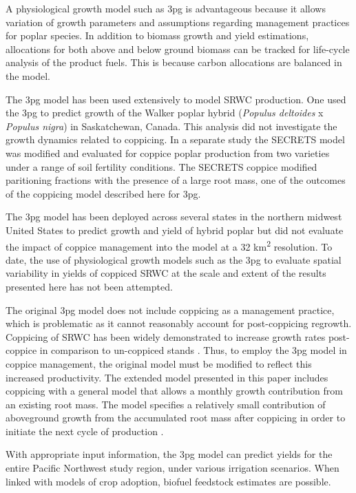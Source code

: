 \documentclass[preprint,12pt]{elsarticle}
\begin{document}
A physiological growth model such as \ac{3pg} is advantageous because
it allows variation of growth parameters and assumptions regarding
management practices for poplar species.  In addition to biomass
growth and yield estimations, allocations for both above and below
ground biomass can be tracked for life-cycle analysis of the product
fuels.  This is because carbon allocations are balanced in the model.

The \ac{3pg} model has been used extensively to model \ac{SRWC}
production. One\cite{Amichev2010} used the \ac{3pg} to predict growth of
the Walker poplar hybrid (\textit{Populus deltoides} x \textit{Populus
  nigra}) in Saskatchewan, Canada. This analysis did not investigate
the growth dynamics related to coppicing. In a separate study
\cite{Deckmyn2004} the \ac{SECRETS} model was modified
and evaluated for coppice poplar production from two
varieties under a range of soil fertility conditions.  The
\ac{SECRETS} coppice modified paritioning fractions with the presence
of a large root mass, one of the outcomes of the coppicing model
described here for \ac{3pg}.

The \ac{3pg} model\cite{Headlee2012} has been deployed across several states
in the northern midwest United States to predict growth and yield of hybrid poplar
but did not evaluate the impact of coppice management into the model
at a 32 km\textsuperscript{2} resolution.  To date,
the use of physiological growth models such as the \ac{3pg} to
evaluate spatial variability in yields of coppiced \ac{SRWC} at the
scale and extent of the results presented here has not been attempted.

The original \ac{3pg} model does not include coppicing as a management
practice, which is problematic as it cannot reasonably account for
post-coppicing regrowth.  Coppicing of \ac{SRWC} has been widely
demonstrated to increase growth rates post-coppice in comparison to
un-coppiced stands
\cite{Verwijst1996,Afas2008a,Sennerby-Forsse1992}. Thus, to employ the
\ac{3pg} model in coppice management, the original model must be
modified to reflect this increased productivity. The extended model
presented in this paper includes coppicing with a general model that
allows a monthly growth contribution from an existing root mass.  The
model specifies a relatively small contribution of aboveground growth
from the accumulated root mass after coppicing in order to initiate
the next cycle of production \cite{Deckmyn2004}.

With appropriate input information, the \ac{3pg} model can predict
yields for the entire Pacific Northwest study region, under various
irrigation scenarios.  When linked with models of crop adoption,
biofuel feedstock estimates are possible.
\end{document}

